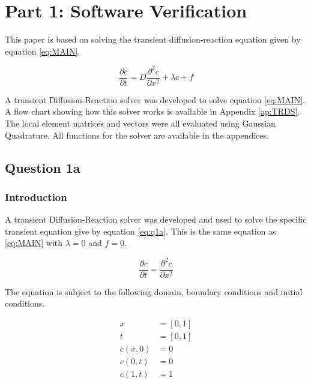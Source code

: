 \documentclass[11pt]{article}
\begin{document}


\clearpage
{}

\section{Part 1: Software Verification}
This paper is based on solving the transient diffusion-reaction equation given by equation \eqref{eq:MAIN}.


\begin{equation}\label{eq:MAIN}
\frac{\partial c}{\partial t}    = D\frac{\partial^2 c}{\partial x^2} + \lambda c + f
\end{equation}

A transient Diffusion-Reaction solver was developed to solve equation \eqref{eq:MAIN}. A flow chart showing how this solver works is available in Appendix \ref{ap:TRDS}. The local element matrices and vectors were all evaluated using Gaussian Quadrature. All functions for the solver are available in the appendices.

\subsection{Question 1a}
\subsubsection{Introduction}

A transient Diffusion-Reaction solver was developed and used to solve the specific transient equation give by equation \eqref{eq:q1a}. This is the same equation as \eqref{eq:MAIN} with $\lambda = 0$ and $f = 0$. 

\begin{equation} \label{eq:q1a}
\frac{\partial c}{\partial t}    = \frac{\partial^2 c}{\partial x^2}
\end{equation}

The equation is subject to the following domain, boundary conditions and initial conditions.

\begin{equation*}
\begin{split}
x &= [0,1] \\
t &= [0,1] \\
c(x,0) &= 0 \\
c(0,t) &= 0 \\
c(1,t) &= 1
\end{split}
\end{equation*}
\end{document}
